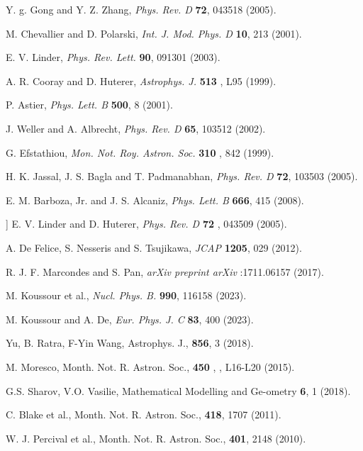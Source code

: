 \documentclass[prd,superscriptaddress,amsfonts,amssymb,amsmath,showpacs,twocolumn]{revtex4-2}
\begin{document}
\begin{thebibliography}{99}
 Y. g. Gong and Y. Z. Zhang, \textit{Phys. Rev. D} \textbf{72},
043518 (2005).

 M. Chevallier and D. Polarski, \textit{Int. J. Mod. Phys. D} 
\textbf{10}, 213 (2001).

 E. V. Linder, \textit{Phys. Rev. Lett.} \textbf{90}, 091301
(2003).

 A. R. Cooray and D. Huterer, \textit{Astrophys. J.} \textbf{513}%
, L95 (1999).

 P. Astier, \textit{Phys. Lett. B} \textbf{500}, 8 (2001).

 J. Weller and A. Albrecht, \textit{Phys. Rev. D} \textbf{65},
103512 (2002).

 G. Efstathiou, \textit{Mon. Not. Roy. Astron. Soc.} \textbf{310}%
, 842 (1999).

 H. K. Jassal, J. S. Bagla and T. Padmanabhan, \textit{Phys.
Rev. D} \textbf{72}, 103503 (2005).

 E. M. Barboza, Jr. and J. S. Alcaniz, \textit{Phys. Lett. B} 
\textbf{666}, 415 (2008).

 ] E. V. Linder and D. Huterer, \textit{Phys. Rev. D} \textbf{72%
}, 043509 (2005).

 A. De Felice, S. Nesseris and S. Tsujikawa, \textit{JCAP} 
\textbf{1205}, 029 (2012).

 R. J. F. Marcondes and S. Pan, \textit{arXiv preprint arXiv}%
:1711.06157 (2017).

 M. Koussour et al., \textit{Nucl. Phys. B.} 
\textbf{990}, 116158 (2023).

 M. Koussour and A. De, \textit{Eur. Phys. J. C} 
\textbf{83}, 400 (2023).


 Yu, B. Ratra, F-Yin Wang, Astrophys. J., \textbf{856}, 3
(2018).

 M. Moresco, Month. Not. R. Astron. Soc., \textbf{450}%
, , L16-L20 (2015).

 G.S. Sharov, V.O. Vasilie, Mathematical Modelling and
Ge-ometry \textbf{6}, 1 (2018).

 C. Blake et al., Month. Not. R. Astron. Soc., \textbf{%
418}, 1707 (2011).

 W. J. Percival et al., Month. Not. R. Astron. Soc., 
\textbf{401}, 2148 (2010).


\end{thebibliography}
\end{document}
